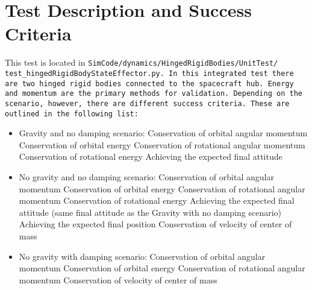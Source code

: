 \section{Test Description and Success Criteria}
This test is located in \tt SimCode/dynamics/HingedRigidBodies/UnitTest/\newline
test\_hingedRigidBodyStateEffector.py. In this integrated test there are two hinged rigid bodies connected to the spacecraft hub. Energy and momentum are the primary methods for validation. Depending on the scenario, however, there are different success criteria. These are outlined in the following list:
\begin{itemize}
	\item Gravity and no damping scenario:
	\subitem Conservation of orbital angular momentum
	\subitem Conservation of orbital energy
	\subitem Conservation of rotational angular momentum
	\subitem Conservation of rotational energy
	\subitem Achieving the expected final attitude
	\item No gravity and no damping scenario:
\subitem Conservation of orbital angular momentum
\subitem Conservation of orbital energy
\subitem Conservation of rotational angular momentum
\subitem Conservation of rotational energy
\subitem Achieving the expected final attitude (same final attitude as the Gravity with no damping scenario)
\subitem Achieving the expected final position
\subitem Conservation of velocity of center of mass
	\item No gravity with damping scenario:
\subitem Conservation of orbital angular momentum
\subitem Conservation of orbital energy
\subitem Conservation of rotational angular momentum
\subitem Conservation of velocity of center of mass

\end{itemize}
